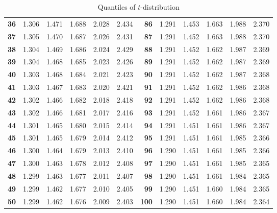 \documentclass[captions=tableheading, 12pt, headings=small, parskip=half]{scrartcl}
\begin{document}
\begin{table}[ht]
{\begin{tabular}{>{\bfseries}rd{1.3}d{1.3}d{1.3}d{2.3}d{2.3}|>{\bfseries}rd{1.3}d{1.3}d{1.3}d{2.3}d{2.3}}
			36 & 1.306 & 1.471 & 1.688 & 2.028 & 2.434 & 86 & 1.291 & 1.453 & 1.663 & 1.988 & 2.370   \\ 
			37 & 1.305 & 1.470 & 1.687 & 2.026 & 2.431 & 87 & 1.291 & 1.452 & 1.663 & 1.988 & 2.370   \\ 
			38 & 1.304 & 1.469 & 1.686 & 2.024 & 2.429 & 88 & 1.291 & 1.452 & 1.662 & 1.987 & 2.369   \\ 
			39 & 1.304 & 1.468 & 1.685 & 2.023 & 2.426 & 89 & 1.291 & 1.452 & 1.662 & 1.987 & 2.369  \\ 
			40 & 1.303 & 1.468 & 1.684 & 2.021 & 2.423 & 90 & 1.291 & 1.452 & 1.662 & 1.987 & 2.368   \\ 
			41 & 1.303 & 1.467 & 1.683 & 2.020 & 2.421 & 91 & 1.291 & 1.452 & 1.662 & 1.986 & 2.368   \\ 
			42 & 1.302 & 1.466 & 1.682 & 2.018 & 2.418 & 92 & 1.291 & 1.452 & 1.662 & 1.986 & 2.368  \\ 
			43 & 1.302 & 1.466 & 1.681 & 2.017 & 2.416 & 93 & 1.291 & 1.452 & 1.661 & 1.986 & 2.367  \\ 
			44 & 1.301 & 1.465 & 1.680 & 2.015 & 2.414 & 94 & 1.291 & 1.451 & 1.661 & 1.986 & 2.367   \\ 
			45 & 1.301 & 1.465 & 1.679 & 2.014 & 2.412 & 95 & 1.291 & 1.451 & 1.661 & 1.985 & 2.366   \\ 
			46 & 1.300 & 1.464 & 1.679 & 2.013 & 2.410 & 96 & 1.290 & 1.451 & 1.661 & 1.985 & 2.366   \\ 
			47 & 1.300 & 1.463 & 1.678 & 2.012 & 2.408 & 97 & 1.290 & 1.451 & 1.661 & 1.985 & 2.365  \\ 
			48 & 1.299 & 1.463 & 1.677 & 2.011 & 2.407 & 98 & 1.290 & 1.451 & 1.661 & 1.984 & 2.365 \\ 
			49 & 1.299 & 1.462 & 1.677 & 2.010 & 2.405 & 99 & 1.290 & 1.451 & 1.660 & 1.984 & 2.365   \\ 
			50 & 1.299 & 1.462 & 1.676 & 2.009 & 2.403 & 100 & 1.290 & 1.451 & 1.660 & 1.984 & 2.364   \\ 
			\bottomrule
			\bottomrule
	\end{tabular}}
	\caption{Quantiles of $t$-distribution}
\end{table}
\end{document}
